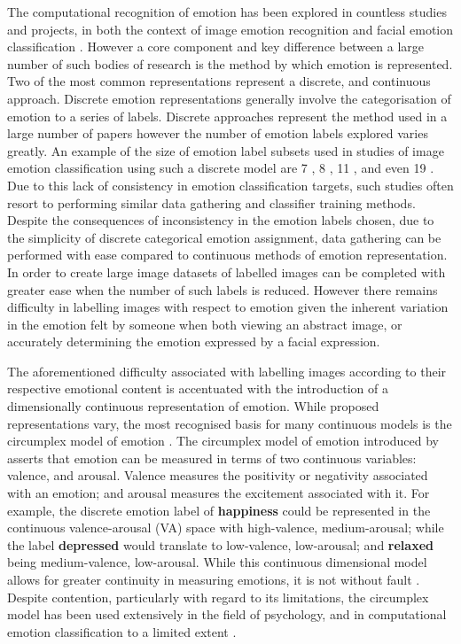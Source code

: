 \documentclass{article}
\begin{document}
The computational recognition of emotion has been explored in countless studies and projects, in both the context of image emotion recognition \citep{machajdik2010affective,zhao2014exploring,kim2018building} and facial emotion classification \citep{mollahosseini2016going}.
However a core component and key difference between a large number of such bodies of research is the method by which emotion is represented.
Two of the most common representations represent a discrete, and continuous approach.
Discrete emotion representations generally involve the categorisation of emotion to a series of labels.
Discrete approaches represent the method used in a large number of papers \citep{machajdik2010affective,ali2017emotional,wangarttalk,mohammad2018wikiart} however the number of emotion labels explored varies greatly.
An example of the size of emotion label subsets used in studies of image emotion classification using such a discrete model are 7 \citep{ali2017emotional}, 8 \citep{machajdik2010affective}, 11 \citep{wangarttalk}, and even 19 \citep{mohammad2018wikiart}.
Due to this lack of consistency in emotion classification targets, such studies often resort to performing similar data gathering and classifier training methods.
Despite the consequences of inconsistency in the emotion labels chosen, due to the simplicity of discrete categorical emotion assignment, data gathering can be performed with ease compared to continuous methods of emotion representation.
In order to create large image datasets of labelled images can be completed with greater ease when the number of such labels is reduced.
However there remains difficulty in labelling images with respect to emotion given the inherent variation in the emotion felt by someone when both viewing an abstract image, or accurately determining the emotion expressed by a facial expression.

The aforementioned difficulty associated with labelling images according to their respective emotional content is accentuated with the introduction of a dimensionally continuous representation of emotion.
While proposed representations vary, the most recognised basis for many continuous models is the circumplex model of emotion \citep{russell1980circumplex}.
The circumplex model of emotion introduced by \citet{russell1980circumplex} asserts that emotion can be measured in terms of two continuous variables: valence, and arousal.
Valence measures the positivity or negativity associated with an emotion; and arousal measures the excitement associated with it.
For example, the discrete emotion label of \textbf{happiness} could be represented in the continuous valence-arousal (VA) space with high-valence, medium-arousal; while the label \textbf{depressed} would translate to low-valence, low-arousal; and \textbf{relaxed} being medium-valence, low-arousal.
While this continuous dimensional model allows for greater continuity in measuring emotions, it is not without fault \citep{larsen1992promises}.
Despite contention, particularly with regard to its limitations, the circumplex model has been used extensively in the field of psychology, and in computational emotion classification to a limited extent \citep{zhao2016predicting}.
\end{document}
